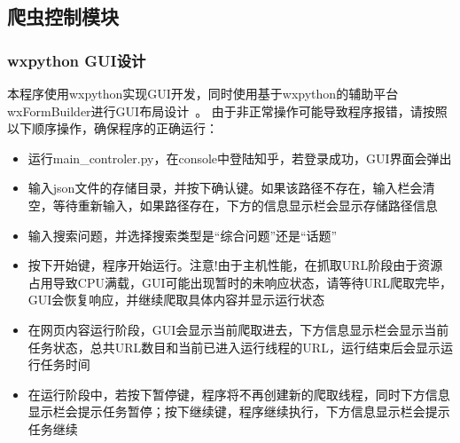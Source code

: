\documentclass[UTF-8,a4paper, 12pt]{article}
\numberwithin{equation}{section}
\begin{document}
\subsection{爬虫控制模块}
\subsubsection{wxpython GUI设计}
本程序使用wxpython实现GUI开发，同时使用基于wxpython的辅助平台wxFormBuilder进行GUI布局设计~\cite{bibtex1}。
由于非正常操作可能导致程序报错，请按照以下顺序操作，确保程序的正确运行：
\begin{itemize}
  \item 运行main\_controler.py，在console中登陆知乎，若登录成功，GUI界面会弹出
  \item 输入json文件的存储目录，并按下确认键。如果该路径不存在，输入栏会清空，等待重新输入，如果路径存在，下方的信息显示栏会显示存储路径信息
  \item 输入搜索问题，并选择搜索类型是“综合问题”还是“话题”
  \item 按下开始键，程序开始运行。注意!由于主机性能，在抓取URL阶段由于资源占用导致CPU满载，GUI可能出现暂时的未响应状态，请等待URL爬取完毕，GUI会恢复响应，并继续爬取具体内容并显示运行状态
  \item 在网页内容运行阶段，GUI会显示当前爬取进去，下方信息显示栏会显示当前任务状态，总共URL数目和当前已进入运行线程的URL，运行结束后会显示运行任务时间
  \item 在运行阶段中，若按下暂停键，程序将不再创建新的爬取线程，同时下方信息显示栏会提示任务暂停；按下继续键，程序继续执行，下方信息显示栏会提示任务继续
\end{itemize}
\end{document}
